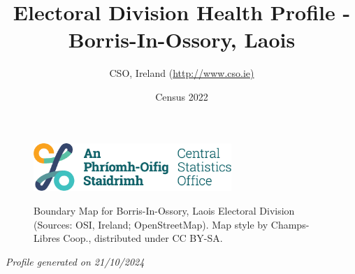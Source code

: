 \documentclass{article}
\title{Electoral Division Health Profile - Borris-In-Ossory, Laois}
\date{Census 2022}
\author{CSO, Ireland  (\url{http://www.cso.ie)}}
\begin{document}


\begin{figure}
	\centering
\includegraphics[width =75mm]{../figures/CSO_Logo.png}
\end{figure}

\begin{figure}[h]
	\centering
	\setlength{\fboxsep}{1pt}
	\caption{\normalsize Boundary Map for Borris-In-Ossory, Laois Electoral Division (Sources: OSI, Ireland; OpenStreetMap). Map style by Champs-Libres Coop., distributed under CC BY-SA.}
	\label{fig:2ae19629-1a6a-13a3-e055-000000000001}
	\end{figure}
	{\let\newpage\relax\maketitle}
	     \begin{center}
         \emph{Profile generated on 21/10/2024}
     \end{center}
\end{document}
